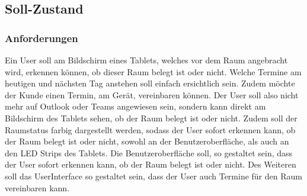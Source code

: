 \subsection{Soll-Zustand}\label{subsec:soll-zustand}
\subsubsection{Anforderungen}\label{subsubsec:anforderungen}
Ein User soll am Bildschirm eines Tablets, welches vor dem Raum angebracht wird, erkennen können, ob dieser Raum belegt ist oder nicht.
Welche Termine am heutigen und nächsten Tag anstehen soll einfach ersichtlich sein.
Zudem möchte der Kunde einen Termin, am Gerät, vereinbaren können.
Der User soll also nicht mehr auf Outlook oder Teams angewiesen sein, sondern kann direkt am Bildschirm des Tablets sehen, ob der Raum belegt ist oder nicht.
Zudem soll der Raumstatus farbig dargestellt werden, sodass der User sofort erkennen kann, ob der Raum belegt ist oder nicht, sowohl an der Benutzeroberfläche, als auch an den LED Strips des Tablets.
Die Benutzeroberfläche soll, so gestaltet sein, dass der User sofort erkennen kann, ob der Raum belegt ist oder nicht.
Des Weiteren soll das \gls{UserInterface} so gestaltet sein, dass der User auch Termine für den Raum vereinbaren kann.

